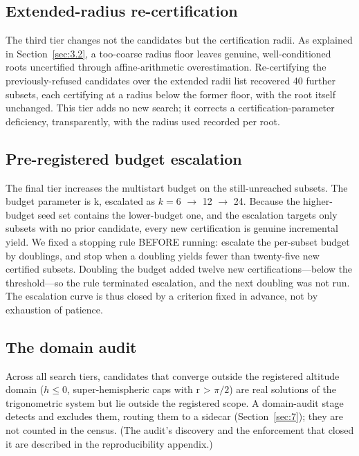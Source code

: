 \documentclass[pdflatex,sn-mathphys-num]{sn-jnl}
\begin{document}
\subsection{Extended-radius re-certification}\label{sec:4.3}

The third tier changes not the candidates but the certification radii. As explained in Section~\ref{sec:3.2}, a too-coarse radius floor leaves genuine, well-conditioned roots uncertified through affine-arithmetic overestimation. Re-certifying the previously-refused candidates over the extended radii list recovered 40 further subsets, each certifying at a radius below the former floor, with the root itself unchanged. This tier adds no new search; it corrects a certification-parameter deficiency, transparently, with the radius used recorded per root.

\subsection{Pre-registered budget escalation}\label{sec:4.4}

The final tier increases the multistart budget on the still-unreached subsets. The budget parameter is k, escalated as $k{=}6$ $\to$ 12 $\to$ 24. Because the higher-budget seed set contains the lower-budget one,  and the escalation targets only subsets with no prior candidate, every new certification is genuine incremental  yield. We fixed a stopping rule BEFORE running: escalate the per-subset budget by doublings, and stop when a doubling yields fewer than twenty-five new certified subsets. Doubling the budget added twelve new 
certifications---below the threshold---so the rule terminated escalation, and the next doubling was not run. The escalation curve is thus closed by a criterion fixed in advance, not by exhaustion of patience.

\subsection{The domain audit}\label{sec:4.5}

Across all search tiers, candidates that converge outside the registered altitude domain ($h\le 0$, super-hemispheric caps with r > $\pi/2$) are real solutions of the trigonometric system but lie outside the registered scope. A domain-audit stage detects and excludes them, routing them to a sidecar
(Section~\ref{sec:7}); they are not counted in the census. (The audit's discovery and the enforcement that closed it are described in the reproducibility appendix.)
\end{document}
